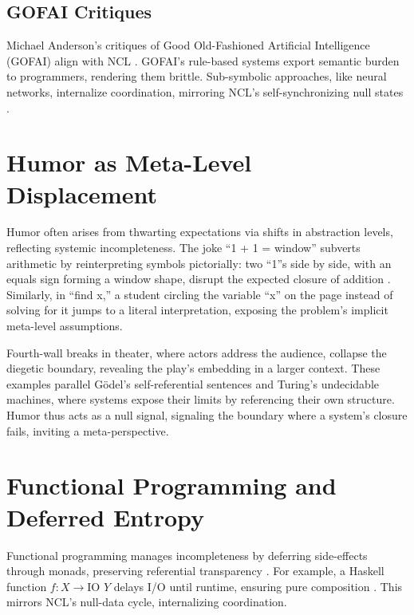 \documentclass{article}
\begin{document}

\subsection{GOFAI Critiques}
Michael Anderson's critiques of Good Old-Fashioned Artificial Intelligence (GOFAI) align with NCL \citep{anderson2014}. GOFAI's rule-based systems export semantic burden to programmers, rendering them brittle. Sub-symbolic approaches, like neural networks, internalize coordination, mirroring NCL's self-synchronizing null states \citep{clark2013, hohwy2013}.

\section{Humor as Meta-Level Displacement}
\label{sec:humor}
Humor often arises from thwarting expectations via shifts in abstraction levels, reflecting systemic incompleteness. The joke ``1 + 1 = window'' subverts arithmetic by reinterpreting symbols pictorially: two ``1''s side by side, with an equals sign forming a window shape, disrupt the expected closure of addition \citep{ciupa2015}. Similarly, in ``find x,'' a student circling the variable ``x'' on the page instead of solving for it jumps to a literal interpretation, exposing the problem's implicit meta-level assumptions.

Fourth-wall breaks in theater, where actors address the audience, collapse the diegetic boundary, revealing the play's embedding in a larger context. These examples parallel G\"{o}del's self-referential sentences and Turing's undecidable machines, where systems expose their limits by referencing their own structure. Humor thus acts as a null signal, signaling the boundary where a system's closure fails, inviting a meta-perspective.

\section{Functional Programming and Deferred Entropy}
\label{sec:programming_entropy}
Functional programming manages incompleteness by deferring side-effects through monads, preserving referential transparency \citep{wadler1992}. For example, a Haskell function \( f : X \to \text{IO } Y \) delays I/O until runtime, ensuring pure composition \citep{turner1979}. This mirrors NCL's null-data cycle, internalizing coordination.
\end{document}
